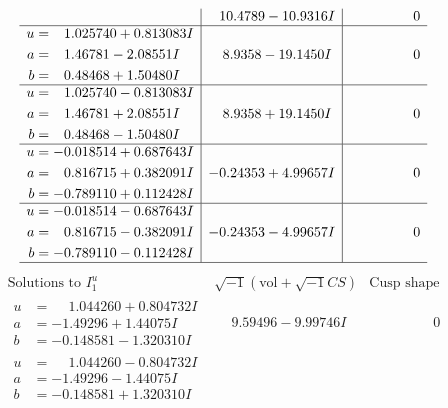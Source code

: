 \documentclass[1p]{elsarticle_modified}
\theoremstyle{definition}
\newcommand{\I}{\sqrt{-1}}
\begin{document}
$$\begin{array}{c|c|c}
 & \phantom{-}10.4789 - 10.9316 I & \phantom{-0.000000 } 0 \\ \hline\begin{aligned}
u &= \phantom{-}1.025740 + 0.813083 I \\
a &= \phantom{-}1.46781 - 2.08551 I \\
b &= \phantom{-}0.48468 + 1.50480 I\end{aligned}
 & \phantom{-}8.9358 - 19.1450 I & \phantom{-0.000000 } 0 \\ \hline\begin{aligned}
u &= \phantom{-}1.025740 - 0.813083 I \\
a &= \phantom{-}1.46781 + 2.08551 I \\
b &= \phantom{-}0.48468 - 1.50480 I\end{aligned}
 & \phantom{-}8.9358 + 19.1450 I & \phantom{-0.000000 } 0 \\ \hline\begin{aligned}
u &= -0.018514 + 0.687643 I \\
a &= \phantom{-}0.816715 + 0.382091 I \\
b &= -0.789110 + 0.112428 I\end{aligned}
 & -0.24353 + 4.99657 I & \phantom{-0.000000 } 0 \\ \hline\begin{aligned}
u &= -0.018514 - 0.687643 I \\
a &= \phantom{-}0.816715 - 0.382091 I \\
b &= -0.789110 - 0.112428 I\end{aligned}
 & -0.24353 - 4.99657 I & \phantom{-0.000000 } 0\\
 \hline 
 \end{array}$$\newpage$$\begin{array}{c|c|c}  
\text{Solutions to }I^u_{1}& \I (\text{vol} + \sqrt{-1}CS) & \text{Cusp shape}\\
 \hline 
\begin{aligned}
u &= \phantom{-}1.044260 + 0.804732 I \\
a &= -1.49296 + 1.44075 I \\
b &= -0.148581 - 1.320310 I\end{aligned}
 & \phantom{-}9.59496 - 9.99746 I & \phantom{-0.000000 } 0 \\ \hline\begin{aligned}
u &= \phantom{-}1.044260 - 0.804732 I \\
a &= -1.49296 - 1.44075 I \\
b &= -0.148581 + 1.320310 I\end{aligned}

\end{array}$$
\end{document}
